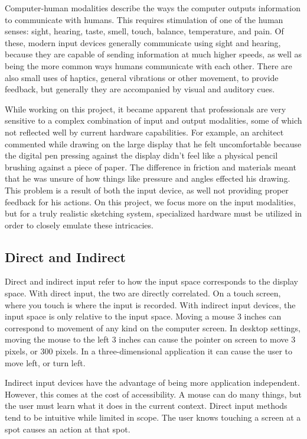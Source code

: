 \documentclass[11pt]{report}
\begin{document}
Computer-human modalities describe the ways the computer outputs information to communicate with humans.
This requires stimulation of one of the human senses: sight, hearing, taste, smell, touch, balance, temperature, and pain. 
Of these, modern input devices generally communicate using sight and hearing, because they are capable of sending information at much higher speeds, as well as being the more common ways humans communicate with each other.
There are also small uses of haptics, general vibrations or other movement, to provide feedback, but generally they are accompanied by visual and auditory cues.

While working on this project, it became apparent that professionals are very sensitive to a complex combination of input and output modalities, some of which not reflected well by current hardware capabilities. 
For example, an architect commented while drawing on the large display that he felt uncomfortable because the digital pen pressing against the display didn't feel like a physical pencil brushing against a piece of paper. 
The difference in friction and materials meant that he was unsure of how things like pressure and angles effected his drawing.
This problem is a result of both the input device, as well not providing proper feedback for his actions.
On this project, we focus more on the input modalities, but for a truly realistic sketching system, specialized hardware must be utilized in order to closely emulate these intricacies.

\subsection{Direct and Indirect}
Direct and indirect input refer to how the input space corresponds to the display space. 
With direct input, the two are directly correlated. 
On a touch screen, where you touch is where the input is recorded. 
With indirect input devices, the input space is only relative to the input space. Moving a mouse 3 inches can correspond to movement of any kind on the computer screen. 
In desktop settings, moving the mouse to the left 3 inches can cause the pointer on screen to move 3 pixels, or 300 pixels. 
In a three-dimensional application it can cause the user to move left, or turn left.

Indirect input devices have the advantage of being more application independent. However, this comes at the cost of accessibility. 
A mouse can do many things, but the user must learn what it does in the current context. 
Direct input methods tend to be intuitive while limited in scope. 
The user knows touching a screen at a spot causes an action at that spot.
\end{document}
